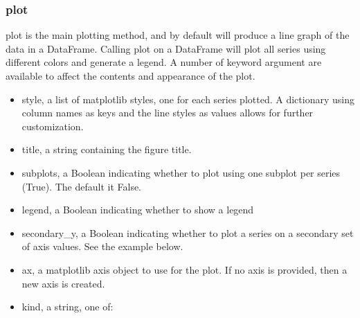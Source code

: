 \documentclass[11pt]{article} %
\begin{document}
\subsubsection{plot}
plot is the main plotting method, and by default will produce a line graph of the data in a DataFrame.
Calling plot on a DataFrame will plot all series using different colors and generate a legend. A number of
keyword argument are available to affect the contents and appearance of the plot.
\begin{itemize}
\item style, a list of matplotlib styles, one for each series plotted. A dictionary using column names as
keys and the line styles as values allows for further customization.
\item title, a string containing the figure title.
\item subplots, a Boolean indicating whether to plot using one subplot per series (True). The default it
False.
\item legend, a Boolean indicating whether to show a legend
\item secondary\_y, a Boolean indicating whether to plot a series on a secondary set of axis values. See the
example below.
\item ax, a matplotlib axis object to use for the plot. If no axis is provided, then a new axis is created.
\item kind, a string, one of:
\end{itemize}

\end{document}
